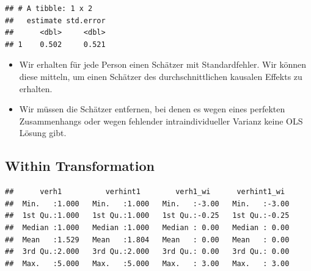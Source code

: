 \documentclass[]{book}
\newenvironment{Shaded}{\begin{snugshade}}{\end{snugshade}}
\newcommand{\DataTypeTok}[1]{\textcolor[rgb]{0.13,0.29,0.53}{#1}}
\newcommand{\KeywordTok}[1]{\textcolor[rgb]{0.13,0.29,0.53}{\textbf{#1}}}
\newcommand{\NormalTok}[1]{#1}
\newcommand{\OperatorTok}[1]{\textcolor[rgb]{0.81,0.36,0.00}{\textbf{#1}}}
\newcommand{\StringTok}[1]{\textcolor[rgb]{0.31,0.60,0.02}{#1}}
\providecommand{\tightlist}{%
  \setlength{\itemsep}{0pt}\setlength{\parskip}{0pt}}
\begin{document}
\begin{verbatim}
## # A tibble: 1 x 2
##   estimate std.error
##      <dbl>     <dbl>
## 1    0.502     0.521
\end{verbatim}

\begin{itemize}
\tightlist
\item
  Wir erhalten für jede Person einen Schätzer mit Standardfehler. Wir können diese mitteln, um einen Schätzer des durchschnittlichen kausalen Effekts zu erhalten.
\item
  Wir müssen die Schätzer entfernen, bei denen es wegen eines perfekten Zusammenhangs oder wegen fehlender intraindividueller Varianz keine OLS Lösung gibt.
\end{itemize}

\hypertarget{within-transformation}{%
\subsection*{Within Transformation}\label{within-transformation}}

\begin{Shaded}
\end{Shaded}

\begin{verbatim}
##      verh1          verhint1        verh1_wi      verhint1_wi   
##  Min.   :1.000   Min.   :1.000   Min.   :-3.00   Min.   :-3.00  
##  1st Qu.:1.000   1st Qu.:1.000   1st Qu.:-0.25   1st Qu.:-0.25  
##  Median :1.000   Median :1.000   Median : 0.00   Median : 0.00  
##  Mean   :1.529   Mean   :1.804   Mean   : 0.00   Mean   : 0.00  
##  3rd Qu.:2.000   3rd Qu.:2.000   3rd Qu.: 0.00   3rd Qu.: 0.00  
##  Max.   :5.000   Max.   :5.000   Max.   : 3.00   Max.   : 3.00
\end{verbatim}
\end{document}
